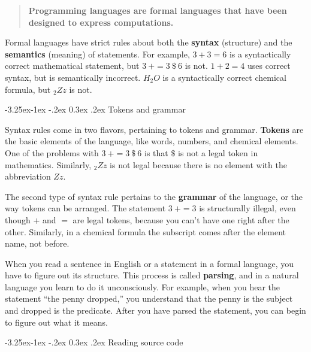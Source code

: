 \documentclass[12pt]{book}
\makeatletter
\renewcommand\subsection{\@startsection{subsection}{2}{\z@}%
    {-3.25ex\@plus -1ex \@minus -.2ex}%
    {0.3ex \@plus .2ex}%
    {\normalfont\large\bfseries}}
\theoremstyle{exercise}
\makeatother
\begin{document}

\begin{quote}
{\bf Programming languages are formal languages that have been designed to express computations.}
\end{quote}


Formal languages have strict rules about both the {\bf syntax} (structure) and the {\bf semantics} (meaning) of statements.
For example, $3 + 3 = 6$ is a syntactically correct mathematical statement, but $3\ + = 3\ \$\ 6$ is not.
$1 + 2 = 4$ uses correct syntax, but is semantically incorrect.
$H_2O$ is a syntactically correct chemical formula, but $_2Zz$ is not.

\subsection{Tokens and grammar}


Syntax rules come in two flavors, pertaining to tokens and grammar.
{\bf Tokens} are the basic elements of the language, like words, numbers, and chemical elements.
One of the problems with $3\ + = 3\ \$\ 6$ is that $\$$ is not a legal token in mathematics.
Similarly, $_2Zz$ is not legal because there is no element with the abbreviation $Zz$.


The second type of syntax rule pertains to the {\bf grammar} of the language, or the way tokens can be arranged.
The statement $3\ + = 3$ is structurally illegal, even though $+$ and $=$ are legal tokens, because you can't have one right after the other.
Similarly, in a chemical formula the subscript comes after the element name, not before.


When you read a sentence in English or a statement in a formal language, you have to figure out its structure.
This process is called {\bf parsing}, and in a natural language you learn to do it unconsciously.
For example, when you hear the statement ``the penny dropped,'' you understand that the penny is the subject and dropped is the predicate.
After you have parsed the statement, you can begin to figure out what it means.

\subsection{Reading source code}
\end{document}
